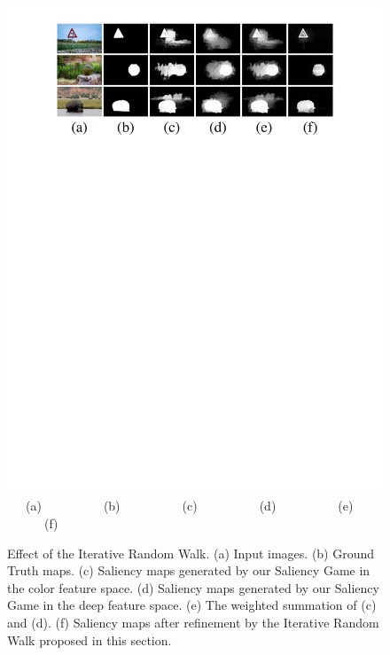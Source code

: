 \documentclass[journal]{IEEEtran}
\begin{document}
\begin{figure}[t]
\begin{center}
  \includegraphics[width=1\linewidth]{figure5.pdf}
         {~~~(a)~~~~~~~~~~(b)~~~~~~~~~~(c)~~~~~~~~~~(d)~~~~~~~~~~(e)~~~~~~~~~~(f)~~~}
\end{center}
\vspace{-10pt}
   \caption{Effect of the Iterative Random Walk. (a) Input images. (b) Ground Truth maps. (c) Saliency maps generated by our Saliency Game in the color feature space. (d) Saliency maps generated by our Saliency Game in the deep feature space. (e) The weighted summation of (c) and (d). (f) Saliency maps after refinement by the Iterative Random Walk proposed in this section. }
\label{fig:5}
\end{figure}
\end{document}
